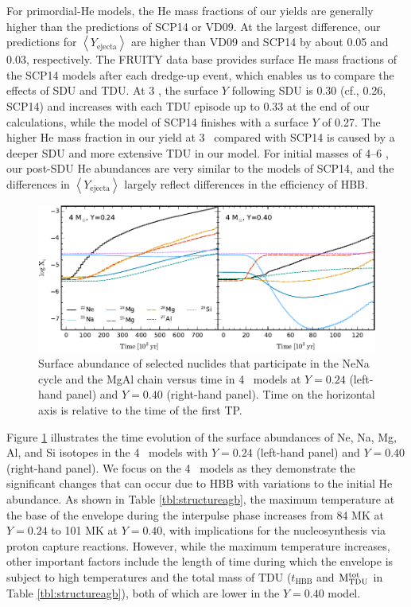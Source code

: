 For primordial-He models, the He mass fractions of our yields are generally higher than the predictions of SCP14 or VD09. At the largest difference, our predictions for $\left<Y_\mathrm{ejecta}\right>$ are higher than VD09 and SCP14 by about 0.05 and 0.03, respectively. The FRUITY data base \citep{Cristallo:2011fz} provides surface He mass fractions of the SCP14 models after each dredge-up event, which enables us to compare the effects of SDU and TDU. At 3 \Msun, the surface $Y$ following SDU is 0.30 (cf., 0.26, SCP14) and increases with each TDU episode up to 0.33 at the end of our calculations, while the model of SCP14 finishes with a surface $Y$ of 0.27. The higher He mass fraction in our yield at 3 \Msun\ compared with SCP14 is caused by a deeper SDU and more extensive TDU in our model. For initial masses of 4--6 \Msun, our post-SDU He abundances are very similar to the models of SCP14, and the differences in $\left<Y_\mathrm{ejecta}\right>$ largely reflect differences in the efficiency of HBB.

\begin{figure}
 \begin{center}\includegraphics[width=\textwidth]{fig-surfnenamgalvstime.pdf}\end{center}
 \caption{Surface abundance of selected nuclides that participate in the NeNa cycle and the MgAl chain versus time in 4 \Msun\ models at $Y=0.24$ (left-hand panel) and $Y=0.40$ (right-hand panel). Time on the horizontal axis is relative to the time of the first TP.}\label{fig:surflightelm}
\end{figure}

Figure \ref{fig:surflightelm} illustrates the time evolution of the surface abundances of Ne, Na, Mg, Al, and Si isotopes in the 4 \Msun\ models with $Y=0.24$ (left-hand panel) and $Y=0.40$ (right-hand panel). We focus on the 4 \Msun\ models as they demonstrate the significant changes that can occur due to HBB with variations to the initial He abundance. As shown in Table \ref{tbl:structureagb}, the maximum temperature at the base of the envelope during the interpulse phase increases from 84 MK at $Y=0.24$ to 101 MK at $Y=0.40$, with implications for the nucleosynthesis via proton capture reactions. However, while the maximum temperature increases, other important factors include the length of time during which the envelope is subject to high temperatures and the total mass of TDU ($t_\mathrm{HBB}$ and $\mathrm{M}_\mathrm{TDU}^\mathrm{tot}$ in Table \ref{tbl:structureagb}), both of which are lower in the $Y=0.40$ model.

